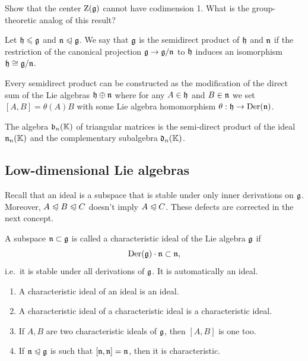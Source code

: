 \begin{xca}
    Show that the center $\mathrm{Z}(\mathfrak{g})$ cannot have codimension 1. What is the group-theoretic analog of this result?
\end{xca}


\begin{defn}
    Let $\mathfrak{h}\leqslant \mathfrak{g}$ and $\mathfrak{n}\trianglelefteqslant \mathfrak{g}$. We say that $\mathfrak{g}$ is the semidirect product of $\mathfrak{h}$ and $\mathfrak{n}$ if the restriction of the canonical projection $\mathfrak{g}\to \mathfrak{g}\slash\mathfrak{n}$ to $\mathfrak{h}$ induces an isomorphism $\mathfrak{h}\cong \mathfrak{g}\slash\mathfrak{n}$.

    Every semidirect product can be constructed as the modification of the direct sum of the Lie algebras $\mathfrak{h}\oplus\mathfrak{n}$ where for any $A\in \mathfrak{h}$ and $B\in\mathfrak{n}$ we set $[A,B]=\theta(A)B$ with some Lie algebra homomorphism $\theta:\mathfrak{h}\to \operatorname{Der}(\mathfrak{n})$.
\end{defn}

\begin{example}
    The algebra $\mathfrak{b}_n(\mathbb{K})$ of triangular matrices is the semi-direct product of the ideal $\mathfrak{n}_n(\mathbb{K})$ and the complementary subalgebra $\mathfrak{d}_n(\mathbb{K})$.
\end{example}





\subsection{Low-dimensional Lie algebras}

Recall that an ideal is a subspace that is stable under only inner derivations on $\mathfrak{g}$. Moreover, $A\trianglelefteqslant B\trianglelefteqslant C$ doesn't imply $A\trianglelefteqslant C$. These defects are corrected in the next concept.

\begin{defn}
    A subspace $\mathfrak{n}\subset \mathfrak{g}$ is called a characteristic ideal of the Lie algebra $\mathfrak{g}$ if 
    \[\operatorname{Der}(\mathfrak{g})\cdot \mathfrak{n}\subset \mathfrak{n},\]
    i.e.~it is stable under all derivations of $\mathfrak{g}$. It is automatically an ideal.
\end{defn}

\begin{xca}
\begin{enumerate}
    \item A characteristic ideal of an ideal is an ideal.
    \item A characteristic ideal of a characteristic ideal is a characteristic ideal.
    \item If $A,B$ are two characteristic ideals of $\mathfrak{g}$, then $[A,B]$ is one too.
    \item If $\mathfrak{n}\trianglelefteqslant \mathfrak{g}$ is such that $[\mathfrak{n},\mathfrak{n}]=\mathfrak{n}$, then it is characteristic.
\end{enumerate}
\end{xca}


